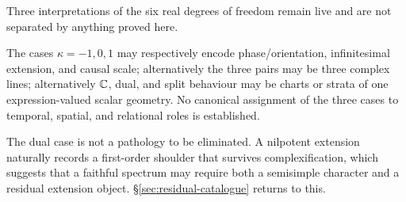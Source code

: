 Three interpretations of the six real degrees of freedom remain live and are not
separated by anything proved here.

\begin{proposal}[Three readings of $6=2+2+2$]\label{prop:three-readings}
The cases $\kappa=-1,0,1$ may respectively encode phase/orientation, infinitesimal
extension, and causal scale; alternatively the three pairs may be three complex
lines; alternatively $\mathbb{C}$, dual, and split behaviour may be charts or strata of one
expression-valued scalar geometry.  No canonical assignment of the three cases to
temporal, spatial, and relational roles is established.
\end{proposal}

\begin{remark}
The dual case is not a pathology to be eliminated.  A nilpotent extension naturally
records a first-order shoulder that survives complexification, which suggests that a
faithful spectrum may require both a semisimple character and a residual extension
object.  \S\ref{sec:residual-catalogue} returns to this.
\end{remark}
